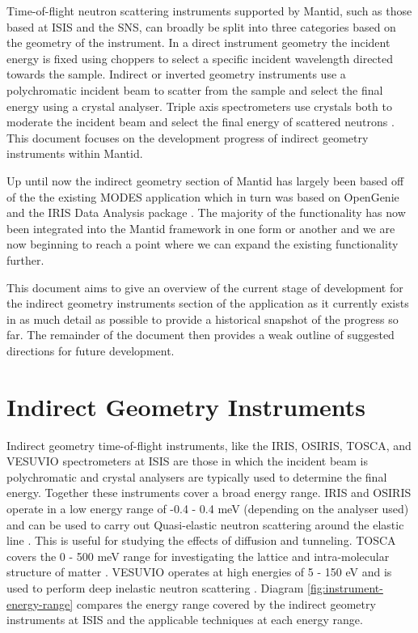 \documentclass[paper=a4, fontsize=11pt]{scrartcl}	%
\numberwithin{equation}{section}															%
\numberwithin{figure}{section}																%
\numberwithin{table}{section}																%
\begin{document}
Time-of-flight neutron scattering instruments supported by Mantid, such as those based at ISIS and the SNS, can broadly be split into three categories based on the geometry of the instrument. In a direct instrument geometry the incident energy is fixed using choppers to select a specific incident wavelength directed towards the sample. Indirect or inverted geometry instruments use a polychromatic incident beam to scatter from the sample and select the final energy using a crystal analyser. Triple axis spectrometers use crystals both to moderate the incident beam and select the final energy of scattered neutrons \citep{fernandezalonso2013neutron}. This document focuses on the development progress of indirect geometry instruments within Mantid.

Up until now the indirect geometry section of Mantid has largely been based off of the the existing MODES application which in turn was based on OpenGenie \cite{wshowells2010} and the IRIS Data Analysis package \cite{wshowells1996}. The majority of the functionality has now been integrated into the Mantid framework in one form or another and we are now beginning to reach a point where we can expand the existing functionality further.

This document aims to give an overview of the current stage of development for the indirect geometry instruments section of the application as it currently exists in as much detail as possible to provide a historical snapshot of the progress so far. The remainder of the document then provides a weak outline of suggested directions for future development.

\clearpage
\section{Indirect Geometry Instruments}
Indirect geometry time-of-flight instruments, like the IRIS, OSIRIS, TOSCA, and VESUVIO spectrometers at ISIS are those in which the incident beam is polychromatic and crystal analysers are typically used to determine the final energy. Together these instruments cover a broad energy range. IRIS and OSIRIS operate in a low energy range of -0.4 - 0.4 meV (depending on the analyser used) and can be used to carry out Quasi-elastic neutron scattering around the elastic line \cite{adams2001iris, telling2003osiris}. This is useful for studying the effects of diffusion  and tunneling. TOSCA covers the 0 - 500 meV range for investigating the lattice and intra-molecular structure of matter \cite{parker2003tosca}. VESUVIO operates at high energies of 5 - 150 eV and is used to perform deep inelastic neutron scattering \cite{mayers2012vesuvio}. Diagram \ref{fig:instrument-energy-range} compares the energy range covered by the indirect geometry instruments at ISIS and the applicable techniques at each energy range.
\end{document}
